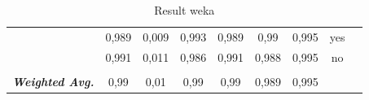 \begin{table}[htbp]
\begin{tabular}{rrrrrrrrr}
		\multicolumn{1}{c}{} & \multicolumn{1}{c}{0,989} & \multicolumn{1}{c}{0,009} & \multicolumn{1}{c}{0,993} & \multicolumn{1}{c}{0,989} & \multicolumn{1}{c}{0,99} & \multicolumn{1}{c}{0,995} & \multicolumn{1}{c}{yes} &  \\
		\multicolumn{1}{c}{} & \multicolumn{1}{c}{0,991} & \multicolumn{1}{c}{0,011} & \multicolumn{1}{c}{0,986} & \multicolumn{1}{c}{0,991} & \multicolumn{1}{c}{0,988} & \multicolumn{1}{c}{0,995} & \multicolumn{1}{c}{no} &  \\
		\multicolumn{1}{c}{} & \multicolumn{1}{c}{} & \multicolumn{1}{c}{} & \multicolumn{1}{c}{} & \multicolumn{1}{c}{} & \multicolumn{1}{c}{} & \multicolumn{1}{c}{} & \multicolumn{1}{c}{} &  \\
		\multicolumn{1}{c}{\textit{\textbf{Weighted Avg.}}} & \multicolumn{1}{c}{0,99} & \multicolumn{1}{c}{0,01} & \multicolumn{1}{c}{0,99} & \multicolumn{1}{c}{0,99} & \multicolumn{1}{c}{0,989} & \multicolumn{1}{c}{0,995} & \multicolumn{1}{c}{} &  \\
		\end{tabular}%
		\label{tab:FTExtendFiltered}%
		\caption{Result weka}
		\end{table}%
		